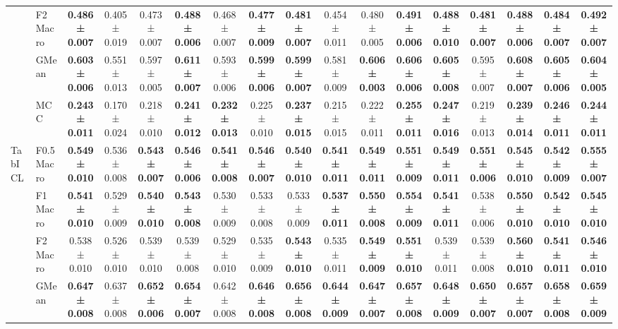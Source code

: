 \begin{table}[H]
{\begin{tabular}{llccccccccccccccc}
 & F2 Macro & \textbf{0.486 ± 0.007} & 0.405 ± 0.019 & 0.473 ± 0.007 & \textbf{0.488 ± 0.006} & 0.468 ± 0.007 & \textbf{0.477 ± 0.009} & \textbf{0.481 ± 0.007} & 0.454 ± 0.011 & 0.480 ± 0.005 & \textbf{0.491 ± 0.006} & \textbf{0.488 ± 0.010} & \textbf{0.481 ± 0.007} & \textbf{0.488 ± 0.006} & \textbf{0.484 ± 0.007} & \textbf{0.492 ± 0.007} \\
 & GMean & \textbf{0.603 ± 0.006} & 0.551 ± 0.013 & 0.597 ± 0.005 & \textbf{0.611 ± 0.007} & 0.593 ± 0.006 & \textbf{0.599 ± 0.006} & \textbf{0.599 ± 0.007} & 0.581 ± 0.009 & \textbf{0.606 ± 0.003} & \textbf{0.606 ± 0.006} & \textbf{0.605 ± 0.008} & 0.595 ± 0.007 & \textbf{0.608 ± 0.007} & \textbf{0.605 ± 0.006} & \textbf{0.604 ± 0.005} \\
 & MCC & \textbf{0.243 ± 0.011} & 0.170 ± 0.024 & 0.218 ± 0.010 & \textbf{0.241 ± 0.012} & \textbf{0.232 ± 0.013} & 0.225 ± 0.010 & \textbf{0.237 ± 0.015} & 0.215 ± 0.015 & 0.222 ± 0.011 & \textbf{0.255 ± 0.011} & \textbf{0.247 ± 0.016} & 0.219 ± 0.013 & \textbf{0.239 ± 0.014} & \textbf{0.246 ± 0.011} & \textbf{0.244 ± 0.011} \\
\cline{1-17}
\multirow[t]{5}{*}{TabICL} & F0.5 Macro & \textbf{0.549 ± 0.010} & 0.536 ± 0.008 & \textbf{0.543 ± 0.007} & \textbf{0.546 ± 0.006} & \textbf{0.541 ± 0.008} & \textbf{0.546 ± 0.007} & \textbf{0.540 ± 0.010} & \textbf{0.541 ± 0.011} & \textbf{0.549 ± 0.011} & \textbf{0.551 ± 0.009} & \textbf{0.549 ± 0.011} & \textbf{0.551 ± 0.006} & \textbf{0.545 ± 0.010} & \textbf{0.542 ± 0.009} & \textbf{0.555 ± 0.007} \\
 & F1 Macro & \textbf{0.541 ± 0.010} & 0.529 ± 0.009 & \textbf{0.540 ± 0.010} & \textbf{0.543 ± 0.008} & 0.530 ± 0.009 & 0.533 ± 0.008 & 0.533 ± 0.009 & \textbf{0.537 ± 0.011} & \textbf{0.550 ± 0.008} & \textbf{0.554 ± 0.009} & \textbf{0.541 ± 0.011} & 0.538 ± 0.006 & \textbf{0.550 ± 0.010} & \textbf{0.542 ± 0.010} & \textbf{0.545 ± 0.010} \\
 & F2 Macro & 0.538 ± 0.010 & 0.526 ± 0.010 & 0.539 ± 0.010 & 0.539 ± 0.008 & 0.529 ± 0.010 & 0.535 ± 0.009 & \textbf{0.543 ± 0.010} & 0.535 ± 0.011 & \textbf{0.549 ± 0.009} & \textbf{0.551 ± 0.010} & 0.539 ± 0.011 & 0.539 ± 0.008 & \textbf{0.560 ± 0.010} & \textbf{0.541 ± 0.011} & \textbf{0.546 ± 0.010} \\
 & GMean & \textbf{0.647 ± 0.008} & 0.637 ± 0.008 & \textbf{0.652 ± 0.006} & \textbf{0.654 ± 0.007} & 0.642 ± 0.008 & \textbf{0.646 ± 0.008} & \textbf{0.656 ± 0.008} & \textbf{0.644 ± 0.009} & \textbf{0.647 ± 0.007} & \textbf{0.657 ± 0.008} & \textbf{0.648 ± 0.009} & \textbf{0.650 ± 0.007} & \textbf{0.657 ± 0.007} & \textbf{0.658 ± 0.008} & \textbf{0.659 ± 0.009} \\

\end{tabular}}
\end{table}
